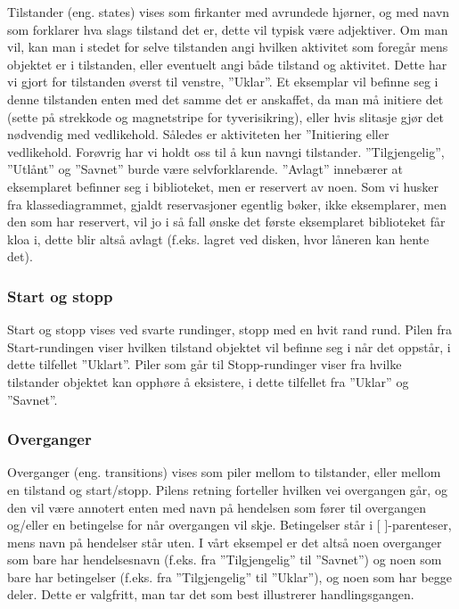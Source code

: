 Tilstander (eng. states) vises som firkanter med avrundede hjørner, og med navn som forklarer hva slags tilstand det er, dette vil typisk være adjektiver. Om man vil, kan man i stedet for selve tilstanden angi hvilken aktivitet som foregår mens objektet er i tilstanden, eller eventuelt angi både tilstand og aktivitet. Dette har vi gjort for tilstanden øverst til venstre, ”Uklar”. Et eksemplar vil befinne seg i denne tilstanden enten med det samme det er anskaffet, da man må initiere det (sette på strekkode og magnetstripe for tyverisikring), eller hvis slitasje gjør det nødvendig med vedlikehold. Således er aktiviteten her ”Initiering eller vedlikehold. Forøvrig har vi holdt oss til å kun navngi tilstander. ”Tilgjengelig”, ”Utlånt” og ”Savnet” burde være selvforklarende. ”Avlagt” innebærer at eksemplaret befinner seg i biblioteket, men er reservert av noen. Som vi husker fra klassediagrammet, gjaldt reservasjoner egentlig bøker, ikke eksemplarer, men den som har reservert, vil jo i så fall ønske det første eksemplaret biblioteket får kloa i, dette blir altså avlagt (f.eks. lagret ved disken, hvor låneren kan hente det).

\subsubsection{Start og stopp}
Start og stopp vises ved svarte rundinger, stopp med en hvit rand rund. Pilen fra Start-rundingen viser hvilken tilstand objektet vil befinne seg i når det oppstår, i dette tilfellet ”Uklart”. Piler som går til Stopp-rundinger viser fra hvilke tilstander objektet kan opphøre å eksistere, i dette tilfellet fra ”Uklar” og ”Savnet”.

\subsubsection{Overganger}
Overganger (eng. transitions) vises som piler mellom to tilstander, eller mellom en tilstand og start/stopp. Pilens retning forteller hvilken vei overgangen går, og den vil være annotert enten med navn på hendelsen som fører til overgangen og/eller en betingelse for når overgangen vil skje. Betingelser står i [ ]-parenteser, mens navn på hendelser står uten. I vårt eksempel er det altså noen overganger som bare har hendelsesnavn (f.eks. fra ”Tilgjengelig” til ”Savnet”) og noen som bare har betingelser (f.eks. fra ”Tilgjengelig” til ”Uklar”), og noen som har begge deler. Dette er valgfritt, man tar det som best illustrerer handlingsgangen.

